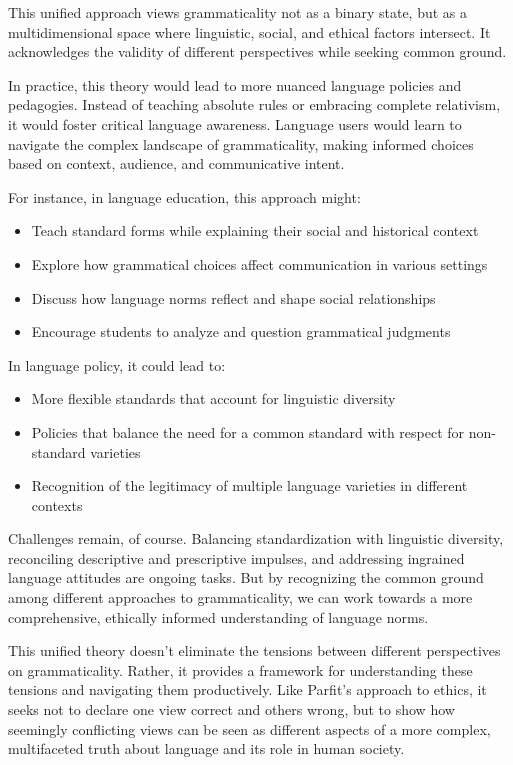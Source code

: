 This unified approach views grammaticality not as a binary state, but as a multidimensional space where linguistic, social, and ethical factors intersect. It acknowledges the validity of different perspectives while seeking common ground.

In practice, this theory would lead to more nuanced language policies and pedagogies. Instead of teaching absolute rules or embracing complete relativism, it would foster critical language awareness. Language users would learn to navigate the complex landscape of grammaticality, making informed choices based on context, audience, and communicative intent.

For instance, in language education, this approach might:

\begin{itemize}
    \item Teach standard forms while explaining their social and historical context
    \item Explore how grammatical choices affect communication in various settings
    \item Discuss how language norms reflect and shape social relationships
    \item Encourage students to analyze and question grammatical judgments
\end{itemize}

In language policy, it could lead to:

\begin{itemize}
    \item More flexible standards that account for linguistic diversity
    \item Policies that balance the need for a common standard with respect for non-standard varieties
    \item Recognition of the legitimacy of multiple language varieties in different contexts
\end{itemize}

Challenges remain, of course. Balancing standardization with linguistic diversity, reconciling descriptive and prescriptive impulses, and addressing ingrained language attitudes are ongoing tasks. But by recognizing the common ground among different approaches to grammaticality, we can work towards a more comprehensive, ethically informed understanding of language norms.

This unified theory doesn't eliminate the tensions between different perspectives on grammaticality. Rather, it provides a framework for understanding these tensions and navigating them productively. Like Parfit's approach to ethics, it seeks not to declare one view correct and others wrong, but to show how seemingly conflicting views can be seen as different aspects of a more complex, multifaceted truth about language and its role in human society.

